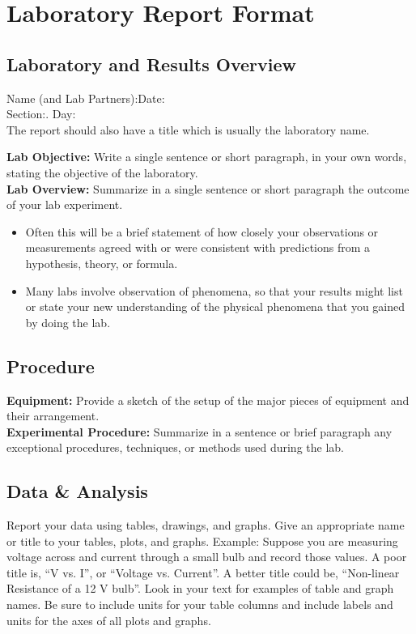 
\chapter{Laboratory Report Format} \label{a:rptformat}
\section{Laboratory and Results Overview}
Name (and Lab Partners):\hfill Date:\\
Section:. \hfill Day:\\

The report should also have a title which is usually the laboratory name.

\noindent \textbf{Lab Objective:} Write a single sentence or short paragraph, in your own words, stating the objective of the laboratory.\\
\textbf{Lab Overview:} Summarize in a single sentence or short paragraph the outcome of your lab experiment.
\begin{itemize}[itemsep=0pt]
	\item Often this will be a brief statement of how closely your observations or measurements agreed with or were consistent with predictions from a hypothesis, theory, or formula.
	\item Many labs involve observation of phenomena, so that your results might list or state your new understanding of the physical phenomena that you gained by doing the lab.
\end{itemize}

\section{Procedure}
\textbf{Equipment:} Provide a sketch of the setup of the major pieces of equipment and their arrangement.\\
\textbf{Experimental Procedure:} Summarize in a sentence or brief paragraph any exceptional procedures, techniques, or methods used during the lab.

\section{Data \& Analysis}
Report your data using tables, drawings, and graphs. Give an appropriate name or title to your tables, plots, and graphs. Example: Suppose you are measuring voltage across and current through a small bulb and record those values. A   poor title is, ``V vs. I'', or ``Voltage vs. Current''. A better title could be, ``Non-linear Resistance of a 12 V bulb''. Look in your text for examples of table and graph names. Be sure to include units for your table columns and include labels and units for the axes of all plots and graphs.

